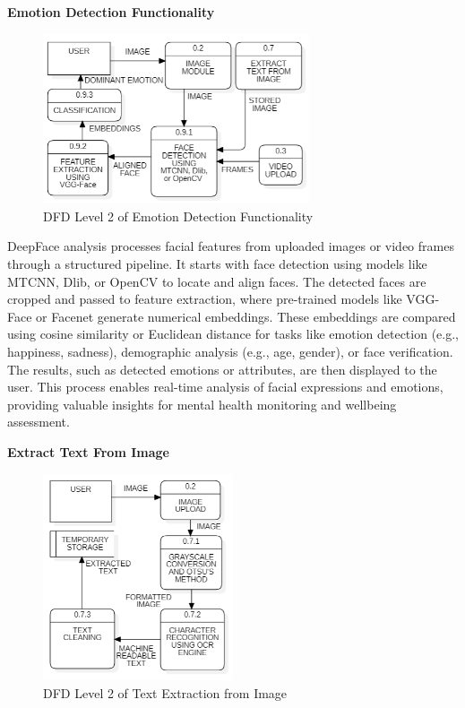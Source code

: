 \vspace{2em}

\noindent
\textbf{Emotion Detection Functionality}

\begin{figure}[h!]  
    \centering
    \includegraphics[width=0.7\textwidth]{Images/DFD L2 EMOTION.png}  
    \caption*{DFD Level 2 of Emotion Detection Functionality}
    \label{dfdl14456}  %
\end{figure}

\noindent
DeepFace analysis processes facial features from uploaded images or video frames through a structured pipeline. It starts with face detection using models like MTCNN, Dlib, or OpenCV to locate and align faces. The detected faces are cropped and passed to feature extraction, where pre-trained models like VGG-Face or Facenet generate numerical embeddings. These embeddings are compared using cosine similarity or Euclidean distance for tasks like emotion detection (e.g., happiness, sadness), demographic analysis (e.g., age, gender), or face verification. The results, such as detected emotions or attributes, are then displayed to the user. This process enables real-time analysis of facial expressions and emotions, providing valuable insights for mental health monitoring and wellbeing assessment.

\pagebreak

\noindent
\textbf{Extract Text From Image}

\begin{figure}[h!]  
    \centering
    \includegraphics[width=0.5\textwidth]{Images/DFD L2 TEXT EXTRACT.png}  
    \caption*{DFD Level 2 of Text Extraction from Image}
    \label{dfdl13456}  %
\end{figure}

